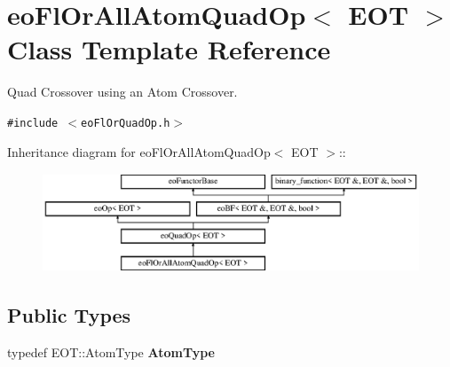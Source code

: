 \section{eo\-Fl\-Or\-All\-Atom\-Quad\-Op$<$ EOT $>$ Class Template Reference}
\label{classeo_fl_or_all_atom_quad_op}
Quad Crossover using an Atom Crossover.  


{\tt \#include $<$eo\-Fl\-Or\-Quad\-Op.h$>$}

Inheritance diagram for eo\-Fl\-Or\-All\-Atom\-Quad\-Op$<$ EOT $>$::\begin{figure}[H]
\begin{center}
\leavevmode
\includegraphics[height=2.96296cm]{classeo_fl_or_all_atom_quad_op}
\end{center}
\end{figure}
\subsection*{Public Types}
\begin{CompactItemize}
\item 
typedef EOT::Atom\-Type {\bf Atom\-Type}\label{classeo_fl_or_all_atom_quad_op_w0}

\end{CompactItemize}
